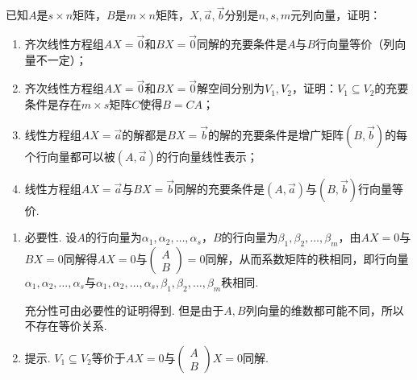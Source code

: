 \begin{exercise}
\begin{exgroup}
        \item 已知$A$是$s \times n$矩阵，$B$是$m \times n$矩阵，$X,\vec{a},\vec{b}$分别是$n,s,m$元列向量，证明：
        \begin{enumerate}
            \item 齐次线性方程组$AX=\vec{0}$和$BX=\vec{0}$同解的充要条件是$A$与$B$行向量等价（列向量不一定）；

            \item 齐次线性方程组$AX=\vec{0}$和$BX=\vec{0}$解空间分别为$V_1,V_2$，证明：$V_1 \subseteq V_2$的充要条件是存在$m \times s$矩阵$C$使得$B=CA$；

            \item 线性方程组$AX=\vec{a}$的解都是$BX=\vec{b}$的解的充要条件是增广矩阵$(B,\vec{b})$的每个行向量都可以被$(A,\vec{a})$的行向量线性表示；

            \item 线性方程组$AX=\vec{a}$与$BX=\vec{b}$同解的充要条件是$(A,\vec{a})$与$(B,\vec{b})$行向量等价.
        \end{enumerate}
        \begin{answer}
            \begin{enumerate}
                \item 必要性. 设$A$的行向量为$\alpha_1,\alpha_2,\ldots,\alpha_s$，$B$的行向量为$\beta_1,\beta_2,\ldots,\beta_m$，由$AX=0$与$BX=0$同解得$AX=0$与$\begin{pmatrix}A \\ B\end{pmatrix}=0$同解，从而系数矩阵的秩相同，即行向量$\alpha_1,\alpha_2,\ldots,\alpha_s$与$\alpha_1,\alpha_2,\ldots,\alpha_s,\beta_1,\beta_2,\ldots,\beta_m$秩相同. %

                      充分性可由必要性的证明得到. 但是由于$A,B$列向量的维数都可能不同，所以不存在等价关系.

                \item 提示. $V_1\subseteq V_2$等价于$AX=0$与$\begin{pmatrix}
                              A \\
                              B
                          \end{pmatrix}X=0$同解.


\end{enumerate}
\end{answer}
\end{exgroup}
\end{exercise}
